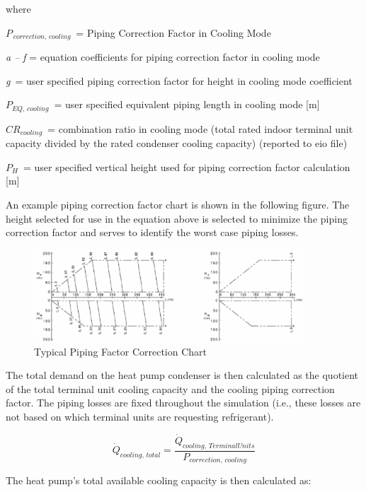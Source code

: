 where

\({P_{\,correction,\,cooling}}\) = Piping Correction Factor in Cooling Mode

\emph{a -- f} = equation coefficients for piping correction factor in cooling mode

\emph{g} = user specified piping correction factor for height in cooling mode coefficient

\(P_{EQ,\,cooling}\) = user specified equivalent piping length in cooling mode [m]

\(CR_{cooling}\) = combination ratio in cooling mode (total rated indoor terminal unit capacity divided by the rated condenser cooling capacity) (reported to eio file)

\(P_H\) = user specified vertical height used for piping correction factor calculation [m]

An example piping correction factor chart is shown in the following figure. The height selected for use in the equation above is selected to minimize the piping correction factor and serves to identify the worst case piping losses.

\begin{figure}[hbtp] %
\centering
\includegraphics[width=0.9\textwidth, height=0.9\textheight, keepaspectratio=true]{media/image5358.png}
\caption{Typical Piping Factor Correction Chart \label{fig:typical-piping-factor-correction-chart}}
\end{figure}

The total demand on the heat pump condenser is then calculated as the quotient of the total terminal unit cooling capacity and the cooling piping correction factor. The piping losses are fixed throughout the simulation (i.e., these losses are not based on which terminal units are requesting refrigerant).

\begin{equation}
  \dot{Q}_{cooling,\,total} = \frac{\dot{Q}_{cooling,\,TerminalUnits}}{P_{correction,\,cooling}}
\end{equation}

The heat pump's total available cooling capacity is then calculated as:

